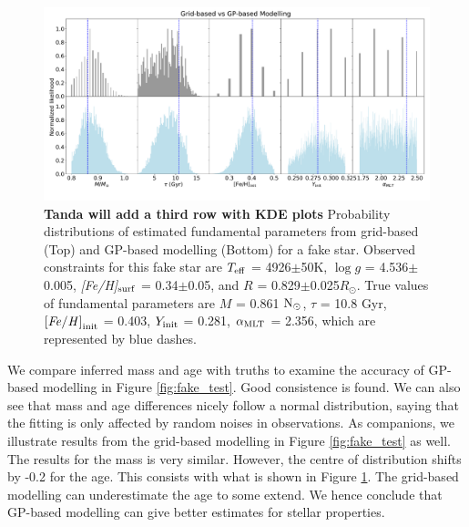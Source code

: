 \begin{figure}
	\includegraphics[width=1.9\columnwidth]{gp_fitting.pdf}
    \caption{{\bf Tanda will add a third row with KDE plots} Probability distributions of estimated fundamental parameters from grid-based (Top) and GP-based modelling (Bottom) for a fake star. Observed constraints for this fake star are $T_{\rm eff}$ = 4926$\pm$50K, $\log g$ = 4.536$\pm$0.005, {\it [Fe/H]}$_{\rm surf}$ =  0.34$\pm$0.05, and $R$ =  0.829$\pm$0.025$R_{\odot}$. True values of fundamental parameters are $M$ = 0.861 $\rm N_{\odot}$, $\tau$ = 10.8 Gyr, $\rm {\it [Fe/H]}_{init}$ = 0.403, $Y_{\rm init}$ = 0.281, $\alpha_{\rm MLT}$ = 2.356, which are represented by blue dashes.} 
  \label{fig:fit_comparison}
\end{figure}

We compare inferred mass and age with truths to examine the accuracy of GP-based modelling in Figure \ref{fig:fake_test}. Good consistence is found. We can also see that mass and age differences nicely follow a normal distribution, saying that the fitting is only affected by random noises in observations. 
%
As companions, we illustrate results from the grid-based modelling in Figure \ref{fig:fake_test} as well. The results for the mass is very similar. However, the centre of distribution shifts by -0.2 for the age. This consists with what is shown in Figure \ref{fig:fit_comparison}. The grid-based modelling can underestimate the age to some extend. We hence conclude that GP-based modelling can give better estimates for stellar properties. 

